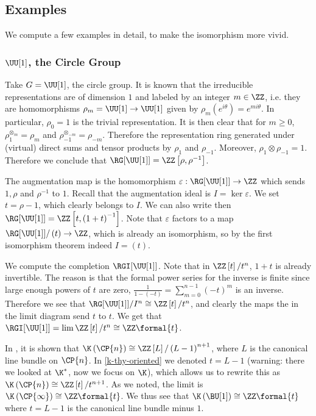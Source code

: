 \subsection{Examples}

We compute a few examples in detail, to make the isomorphism more vivid.

\subsubsection{\texorpdfstring{$\UU[1]$}{U(1)}, the Circle Group}

Take $G = \UU[1]$, the circle group.
It is known that the irreducible representations are of dimension $1$ and labeled by an integer $m \in \ZZ$, i.e. they are homomorphisms $\rho_m = \UU[1] \to \UU[1]$ given by $\rho_m\left(e^{i \theta}\right) = e^{m i \theta}$.
In particular, $\rho_0 = 1$ is the trivial representation.
It is then clear that for $m \geq 0$, $\rho_1^{\otimes_m} = \rho_m$ and $\rho_{-1}^{\otimes_{-m}} = \rho_{-m}$.
Therefore the representation ring generated under (virtual) direct sums and tensor products by $\rho_1$ and $\rho_{-1}$.
Moreover, $\rho_1 \otimes \rho_{-1} = 1$.
Therefore we conclude that $\RG[\UU[1]] = \ZZ\left[\rho, \rho^{-1}\right]$.

The augmentation map is the homomorphism $\varepsilon: \RG[\UU[1]] \to \ZZ$ which sends $1,\rho$ and $\rho^{-1}$ to $1$.
Recall that the augmentation ideal is $I = \ker \varepsilon$.
We set $t = \rho-1$, which clearly belongs to $I$.
We can also write then $\RG[\UU[1]] = \ZZ\left[t, \left(1+t\right)^{-1}\right]$.
Note that $\varepsilon$ factors to a map $\RG[\UU[1]]/\left(t\right) \to \ZZ$, which is already an isomorphism, so by the first isomorphism theorem indeed $I = \left(t\right)$.

We compute the completion $\RGI[{\UU[1]}]$.
Note that in $\ZZ\left[t\right]/t^n$, $1+t$ is already invertible.
The reason is that the formal power series for the inverse is finite since large enough powers of $t$ are zero, $\frac{1}{1-\left(-t\right)} = \sum_{m=0}^{n-1} \left(-t\right)^m$ is an inverse.
Therefore we see that $\RG[\UU[1]]/I^n \cong \ZZ\left[t\right]/t^n$, and clearly the maps the in the limit diagram send $t$ to $t$.
We get that $\RGI[{\UU[1]}] = \lim \ZZ\left[t\right]/t^n \cong \ZZ\formal{t}$.

In \cite[proposition 2.24]{VB}, it is shown that $\K\left(\CP{n}\right) \cong \ZZ\left[L\right] / \left(L-1\right)^{n+1}$, where $L$ is the canonical line bundle on $\CP{n}$.
In \ref{k-thy-oriented} we denoted $t = L-1$ (warning: there we looked at $\K^*$, now we focus on $\K$), which allows us to rewrite this as $\K\left(\CP{n}\right) \cong \ZZ\left[t\right] / t^{n+1}$.
As we noted, the limit is $\K\left(\CP{\infty}\right) \cong \ZZ\formal{t}$.
We thus see that $\K\left(\BU[1]\right) \cong \ZZ\formal{t}$ where $t = L - 1$ is the canonical line bundle minus $1$.

